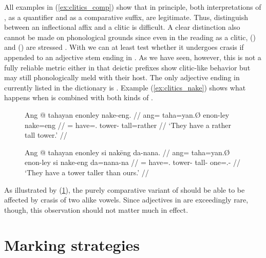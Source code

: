 All examples in (\ref{ex:clitics_comp}) show that in principle, both
interpretations of , as a quantifier and as a
comparative suffix, are legitimate. Thus, distinguish between
an inflectional affix and a clitic is difficult. A clear distinction also cannot
be made on phonological grounds since even in the reading as a clitic,
 (\Comp{}) and  (\Supl{}) are
stressed \parencite[compare][90--92]{spencerluis2012}. With
 we can at least test whether it undergoes crasis if
appended to an adjective stem ending in . As we
have seen, however, this is not a fully reliable metric either in that deictic
prefixes show clitic-like behavior but may still phonologically meld with their
host. The only adjective ending in  currently
listed in the dictionary is . Example
(\ref{ex:clitics_nake}) shows what happens when  is combined
with both kinds of .

\begin{figure}
\pex\label{ex:clitics_nake}
\a\label{ex:clitics_nake1}\begingl
	\gla Ang @ tahayan enonley nake-eng. //
	\glb ang= taha=yan.Ø enon-ley nake=eng //
	\glc \Aarg{}= have=\TplM{}.\Top{} tower-\PargI{} tall=rather //
	\glft `They have a rather tall tower.' //
\endgl

\a\label{ex:clitics_nake2}\begingl
	\gla Ang @ tahayan enonley si nakēng da-nana. //
	\glb ang= taha=yan.Ø enon-ley si nake-eng da=nana-na //
	\glc \Aarg{}= have=\TplM{}.\Top{} tower-\PargI{} \Rel{} tall-\Comp{}
		one=\Fpl{}.\Gen{}-\Gen{} //
	\glft `They have a tower taller than ours.' //
\endgl
\xe
\end{figure}

As illustrated by (\ref{ex:clitics_nake2}), the purely comparative variant of
 should be able to be affected by crasis of two alike vowels.
Since adjectives in  are exceedingly rare, though, this
observation should not matter much in effect.



\section{Marking strategies}
\label{sec:markstrat}

